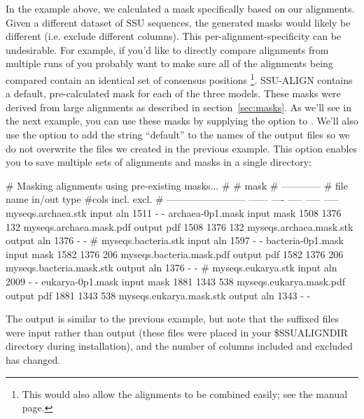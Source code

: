 In the  example above, we calculated a mask
specifically based on our  alignments. Given a different
dataset of SSU sequences, the generated masks would likely be
different (i.e. exclude different columns). This
per-alignment-specificity can be undesirable. For example, if you'd
like to directly compare alignments from multiple runs of
 you probably want to make sure all of the
alignments being compared contain an identical set of consensus
positions \footnote{This would also allow the alignments to be combined
easily; see the  manual page.}. SSU-ALIGN
contains a default, pre-calculated mask for each of the three
models. These masks were derived from large alignments as
described in section~\ref{sec:masks}. As we'll see in the next example, you
can use these masks by supplying the  option to
. We'll also use the  option to add the
string ``default'' to the names of the output files so we do not
overwrite the files we created in the previous example. This option
enables you to save multiple sets of alignments and masks in a single
directory:


\begin{sreoutput}
# Masking alignments using pre-existing masks...
#
#                                                    mask    
#                                                ------------
# file name                 in/out  type  #cols  incl.  excl.
# ------------------------  ------  ----  -----  -----  -----
  myseqs.archaea.stk         input   aln   1511      -      -
  archaea-0p1.mask           input  mask   1508   1376    132
  myseqs.archaea.mask.pdf   output   pdf   1508   1376    132
  myseqs.archaea.mask.stk   output   aln   1376      -      -
#
  myseqs.bacteria.stk        input   aln   1597      -      -
  bacteria-0p1.mask          input  mask   1582   1376    206
  myseqs.bacteria.mask.pdf  output   pdf   1582   1376    206
  myseqs.bacteria.mask.stk  output   aln   1376      -      -
#
  myseqs.eukarya.stk         input   aln   2009      -      -
  eukarya-0p1.mask           input  mask   1881   1343    538
  myseqs.eukarya.mask.pdf   output   pdf   1881   1343    538
  myseqs.eukarya.mask.stk   output   aln   1343      -      -
\end{sreoutput}

The output is similar to the previous example, but note that the
 suffixed files were input rather than output (these files
were placed in your \$SSUALIGNDIR directory during installation), and the number
of columns included and excluded has changed.

